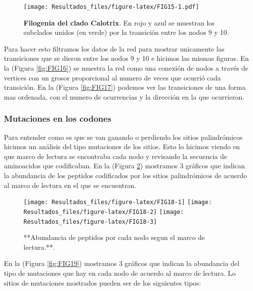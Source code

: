 \documentclass[
]{book}
\begin{document}
\begin{figure}
\centering
\texttt{[image: Resultados\_files/figure-latex/FIG15-1.pdf]}
\caption{\label{fig:FIG15}\textbf{Filogenia del clado Calotrix}. En rojo y azul se muestran los subclados unidos (en verde) por la transición entre los nodos 9 y 10.}
\end{figure}

Para hacer esto filtramos los datos de la red para mostrar unicamente las transiciones que se dieron entre los nodos 9 y 10 e hicimos las mismas figuras.
En la (Figura \ref{fig:FIG16}) se muestra la red como una conexión de nodos a través de vertices con un grosor proporcional al numero de veces que ocurrió cada transición. En la (Figura \ref{fig:FIG17}) podemos ver las transiciones de una forma mas ordenada, con el numero de ocurrencias y la dirección en la que ocurrieron.

\hypertarget{mutaciones-en-los-codones}{%
\subsubsection{Mutaciones en los codones}\label{mutaciones-en-los-codones}}

Para entender como es que se van ganando o perdiendo los sitios palindrómicos hicimos un análisis del tipo mutaciones de los sitios. Esto lo hicimos viendo en que marco de lectura se encontraba cada nodo y revisando la secuencia de aminoacidos que codificaban. En la (Figura \ref{fig:FIG18}) mostramos 3 gráficos que indican la abundancia de los peptidos codificados por los sitios palindrómicos de acuerdo al marco de lectura en el que se encuentran.

\begin{figure}

{\centering \texttt{[image: Resultados\_files/figure-latex/FIG18-1]} \texttt{[image: Resultados\_files/figure-latex/FIG18-2]} \texttt{[image: Resultados\_files/figure-latex/FIG18-3]} 

}

\caption{**Abundancia de peptidos por cada nodo segun el marco de lectura.**.}\label{fig:FIG18}
\end{figure}

En la (Figura \ref{fig:FIG19}) mostramos 3 gráficos que indican la abundancia del tipo de mutaciones que hay en cada nodo de acuerdo al marco de lectura. Lo sitios de mutaciones mostrados pueden ser de los siguientes tipos:
\end{document}
